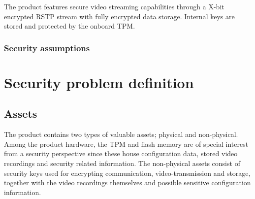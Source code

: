 \documentclass[10pt]{article}
\begin{document}
        The product features secure video streaming capabilities through a
        X-bit encrypted RSTP stream with fully encrypted data storage. Internal
        keys are stored and protected by the onboard TPM.

    \subsubsection{Security assumptions}

       \begin{itemize}
       \end{itemize}

  \section{Security problem definition}

    \subsection{Assets}

      The product contains two types of valuable assets; physical and
      non-physical. Among the product hardware, the TPM and flash memory
      are of special interest from a security perspective since these house
      configuration data, stored video recordings and security related
      information. The non-physical assets consist of security keys used for
      encrypting communication, video-transmission and storage, together with
      the video recordings themselves and possible sensitive configuration
      information.
\end{document}
